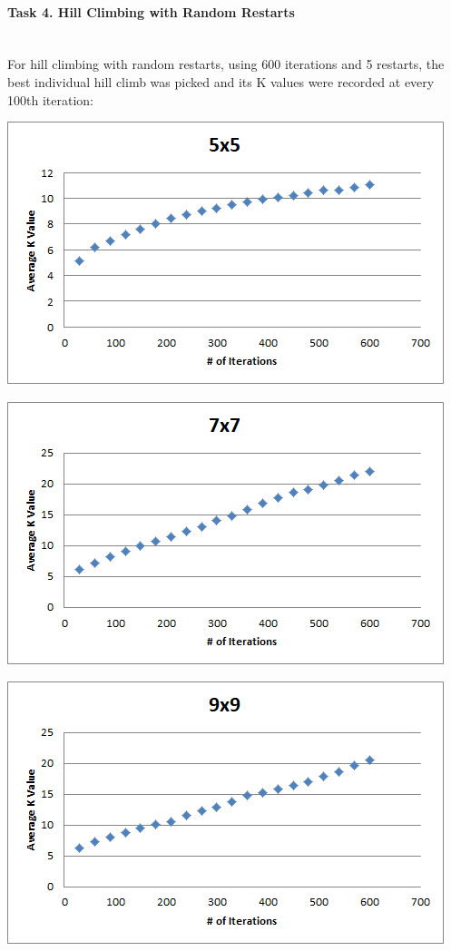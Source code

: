 \documentclass[12pt, letterpaper]{article}
\begin{document}
\paragraph{Task 4. Hill Climbing with Random Restarts} \mbox{}\\

For hill climbing with random restarts, using 600 iterations and 5 restarts, the best individual hill climb was picked and its K values were recorded at every 100th iteration:

\includegraphics[width=\linewidth]{"Task 4/5x5 Scatterplot"}

\includegraphics[width=\linewidth]{"Task 4/7x7 Scatterplot"}

\includegraphics[width=\linewidth]{"Task 4/9x9 Scatterplot"}
\end{document}
